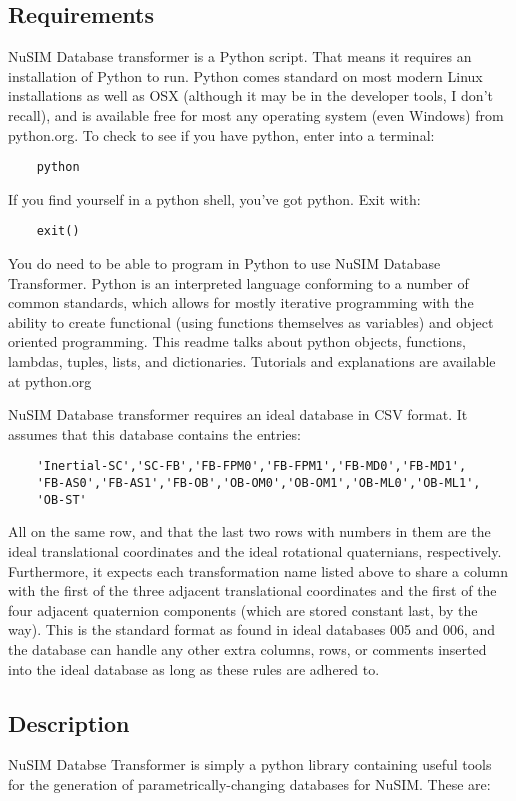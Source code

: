 \subsection{Requirements}
	NuSIM Database transformer is a Python script. That means it 
requires an installation of Python to run. Python comes standard on most 
modern Linux installations as well as OSX (although it may be in the 
developer tools, I don't recall), and is available free for most any 
operating system (even Windows) from python.org. To check to see if you 
have python, enter into a terminal:
\begin{verbatim}
	python
\end{verbatim}
If you find yourself in a python shell, you've got python. Exit with:
\begin{verbatim}
	exit()
\end{verbatim}
	You do need to be able to program in Python to use NuSIM Database 
Transformer. Python is an interpreted language conforming to a number of 
common standards, which allows for mostly iterative programming with the 
ability to create functional (using functions themselves as variables) and 
object oriented programming. This readme talks about python objects,
functions, lambdas, tuples, lists, and dictionaries. Tutorials and 
explanations are available at python.org

	NuSIM Database transformer requires an ideal database in CSV 
format. It assumes that this database contains the entries:
\begin{verbatim}
	'Inertial-SC','SC-FB','FB-FPM0','FB-FPM1','FB-MD0','FB-MD1',
	'FB-AS0','FB-AS1','FB-OB','OB-OM0','OB-OM1','OB-ML0','OB-ML1',
	'OB-ST'
\end{verbatim}
All on the same row, and that the last two rows with numbers in them are 
the ideal translational coordinates and the ideal rotational quaternians, 
respectively. Furthermore, it expects each transformation name listed above 
to share a column with the first of the three adjacent translational 
coordinates and the first of the four adjacent quaternion components (which 
are stored constant last, by the way). This is the standard format as found 
in ideal databases 005 and 006, and the database can handle any other extra 
columns, rows, or comments inserted into the ideal database as long as 
these rules are adhered to. 

\subsection{Description}
	NuSIM Databse Transformer is simply a python library containing 
useful tools for the generation of parametrically-changing databases for 
NuSIM. These are:

